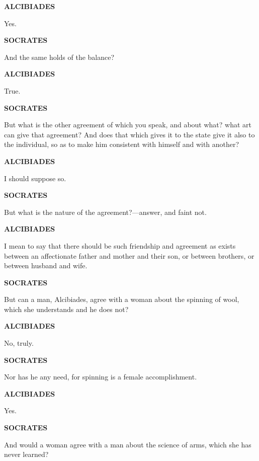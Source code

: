 \documentclass[11pt,letter]{article}
\begin{document}
\par \textbf{ALCIBIADES}
\par   Yes.

\par \textbf{SOCRATES}
\par   And the same holds of the balance?

\par \textbf{ALCIBIADES}
\par   True.

\par \textbf{SOCRATES}
\par   But what is the other agreement of which you speak, and about what? what art can give that agreement? And does that which gives it to the state give it also to the individual, so as to make him consistent with himself and with another?

\par \textbf{ALCIBIADES}
\par   I should suppose so.

\par \textbf{SOCRATES}
\par   But what is the nature of the agreement?—answer, and faint not.

\par \textbf{ALCIBIADES}
\par   I mean to say that there should be such friendship and agreement as exists between an affectionate father and mother and their son, or between brothers, or between husband and wife.

\par \textbf{SOCRATES}
\par   But can a man, Alcibiades, agree with a woman about the spinning of wool, which she understands and he does not?

\par \textbf{ALCIBIADES}
\par   No, truly.

\par \textbf{SOCRATES}
\par   Nor has he any need, for spinning is a female accomplishment.

\par \textbf{ALCIBIADES}
\par   Yes.

\par \textbf{SOCRATES}
\par   And would a woman agree with a man about the science of arms, which she has never learned?
\end{document}
